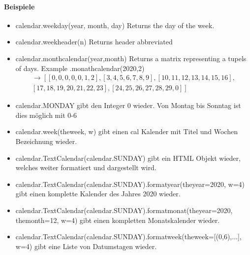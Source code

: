 \paragraph*{Beispiele}

\begin{itemize}
	\item calendar.weekday(year, month, day) Returns the day of the week.
	\item calendar.weekheader(n) Returns header abbreviated
	\item calendar.monthcalendar(year,month) Returns a matrix representing a tupels of days. Example .monathcalendar(2020,2) 
	\begin{align}
		\rightarrow \left[\left[0, 0, 0, 0, 0, 1, 2\right], \left[3, 4, 5, 6, 7, 8, 9\right], \left[10, 11, 12, 13, 14, 15, 16\right],\right. \\
		\left.\left[17, 18, 19, 20, 21, 22, 23\right], \left[24, 25, 26, 27, 28, 29, 0\right]\right]
	\end{align}
	\item calendar.MONDAY gibt den Integer 0 wieder. Von Montag bis Sonntag ist dies möglich mit 0-6
	\item calendar.week(theweek, w) gibt einen cal Kalender mit Titel und Wochen Bezeichnung wieder.
	\item calendar.TextCalendar(calendar.SUNDAY) gibt ein HTML Objekt wieder, welches weiter formatiert und dargestellt wird.
	\item calendar.TextCalendar(calendar.SUNDAY).formatyear(theyear=2020, w=4) gibt einen komplette Kalender des Jahres 2020 wieder.
	\item calendar.TextCalendar(calendar.SUNDAY).formatmonat(theyear=2020, themonth=12, w=4) gibt einen kompletten Monatskalender wieder.
	\item calendar.TextCalendar(calendar.SUNDAY).formatweek(theweek=[(0,6),$\dots$], w=4) gibt eine Liste von Datumstagen wieder.
\end{itemize}



